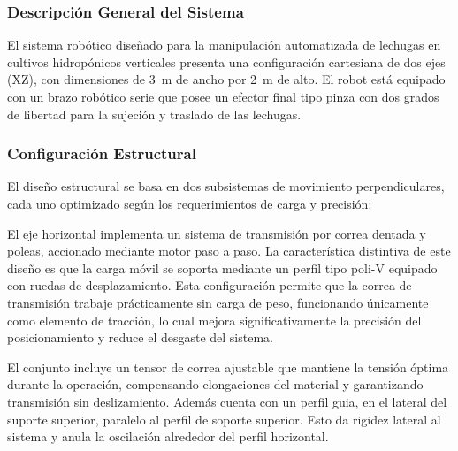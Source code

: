
\subsubsection{Descripción General del Sistema}

El sistema robótico diseñado para la manipulación automatizada de lechugas en cultivos hidropónicos verticales presenta una configuración cartesiana de dos ejes (XZ), con dimensiones de 3~m de ancho por 2~m de alto. El robot está equipado con un brazo robótico serie que posee un efector final tipo pinza con dos grados de libertad para la sujeción y traslado de las lechugas.

\subsubsection{Configuración Estructural}

El diseño estructural se basa en dos subsistemas de movimiento perpendiculares, cada uno optimizado según los requerimientos de carga y precisión:

El eje horizontal implementa un sistema de transmisión por correa dentada y poleas, accionado mediante motor paso a paso. La característica distintiva de este diseño es que la carga móvil se soporta mediante un perfil tipo poli-V equipado con ruedas de desplazamiento. Esta configuración permite que la correa de transmisión trabaje prácticamente sin carga de peso, funcionando únicamente como elemento de tracción, lo cual mejora significativamente la precisión del posicionamiento y reduce el desgaste del sistema.

El conjunto incluye un tensor de correa ajustable que mantiene la tensión óptima durante la operación, compensando elongaciones del material y garantizando transmisión sin deslizamiento. Además cuenta con un perfil guia, en el lateral del suporte superior, paralelo al perfil de soporte superior. Esto da rigidez lateral al sistema y anula la oscilación alrededor del perfil horizontal.


